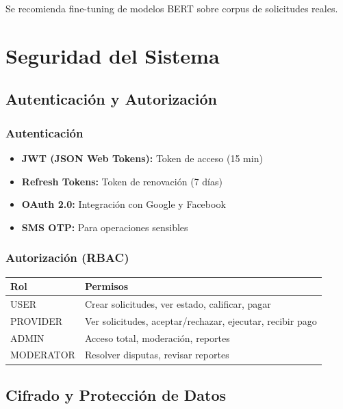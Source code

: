 \documentclass[12pt,a4paper,spanish]{article}
\begin{document}
Se recomienda fine-tuning de modelos BERT sobre corpus de solicitudes reales.

\newpage

\section{Seguridad del Sistema}

\subsection{Autenticación y Autorización}

\subsubsection{Autenticación}

\begin{itemize}
    \item \textbf{JWT (JSON Web Tokens):} Token de acceso (15 min)
    \item \textbf{Refresh Tokens:} Token de renovación (7 días)
    \item \textbf{OAuth 2.0:} Integración con Google y Facebook
    \item \textbf{SMS OTP:} Para operaciones sensibles
\end{itemize}

\subsubsection{Autorización (RBAC)}

\begin{center}
\begin{tabular}{|l|p{8cm}|}
    \toprule
    \textbf{Rol} & \textbf{Permisos} \\
    \midrule
    USER & Crear solicitudes, ver estado, calificar, pagar \\
    PROVIDER & Ver solicitudes, aceptar/rechazar, ejecutar, recibir pago \\
    ADMIN & Acceso total, moderación, reportes \\
    MODERATOR & Resolver disputas, revisar reportes \\
    \bottomrule
\end{tabular}
\end{center}

\subsection{Cifrado y Protección de Datos}
\end{document}
